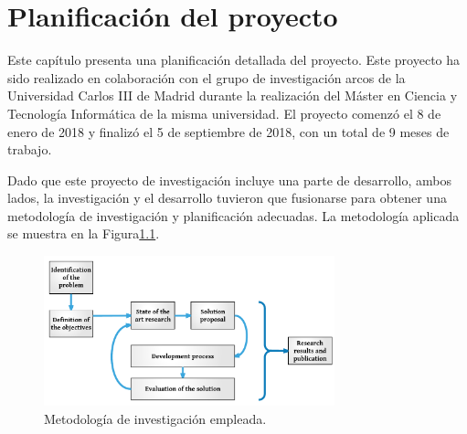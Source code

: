 \chead[]{}
\renewcommand{\headrulewidth}{0.5pt}

\lfoot[]{}
\cfoot[]{}
\rfoot[]{}
\renewcommand{\footrulewidth}{0pt}

\chapter{Planificación del proyecto}
\label{ch:planificacion_proyecto}

Este capítulo presenta una planificación detallada del proyecto. Este proyecto ha sido realizado en colaboración con el grupo de investigación \acrshort{arcos} de la Universidad Carlos III de Madrid durante la realización del Máster en Ciencia y Tecnología Informática de la misma universidad. El proyecto comenzó el 8 de enero de 2018 y finalizó el 5 de septiembre de 2018, con un total de 9 meses de trabajo.

Dado que este proyecto de investigación incluye una parte de desarrollo, ambos lados, la investigación y el desarrollo tuvieron que fusionarse para obtener una metodología de investigación y planificación adecuadas. La metodología aplicada se muestra en la Figura\ref{fig:methodology}.

\vspace{0.35cm}
\begin{figure}[htbp]
 	\centering
 	\includegraphics[width=0.75\textwidth]{figures/methodology.pdf}
 	\caption{Metodología de investigación empleada.}
	\label{fig:methodology}
\end{figure}
\vspace{0.35cm}


